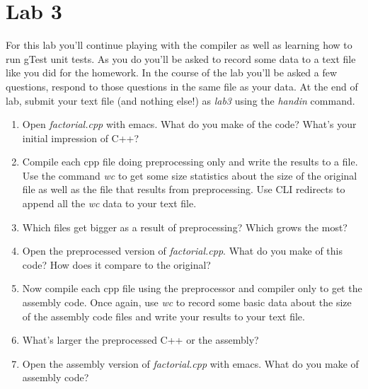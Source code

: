 \documentclass[]{tufte-handout}
\begin{document}
\section{Lab 3}

For this lab you'll continue playing with the compiler as well as learning how to run gTest unit tests. As you do you'll be asked to record some data to a text file like you did for the homework. In the course of the lab you'll be asked a few questions, respond to those questions in the same file as your data. At the end of lab, submit your text file (and nothing else!) as \textit{lab3} using the \textit{handin} command.

\begin{enumerate}
\item Open \textit{factorial.cpp} with emacs. What do you make of the code? What's your initial impression of C++?

\item Compile each cpp file doing preprocessing only and write the results to a file. Use the command \textit{wc} to get some size statistics about the size of the original file as well as the file that results from preprocessing. Use CLI redirects to append all the \textit{wc} data to your text file.

\item Which files get bigger as a result of preprocessing? Which grows the most? 

\item Open the preprocessed version of \textit{factorial.cpp}. What do you make of this code? How does it compare to the original?

\item Now compile each cpp file using the preprocessor and compiler only to get the assembly code.  Once again, use \textit{wc} to record some basic data about the size of the assembly code files and write your results to your text file.

\item What's larger the preprocessed C++ or the assembly? 

\item Open the assembly version of \textit{factorial.cpp} with emacs. What do you make of assembly code?


\end{enumerate}
\end{document}
